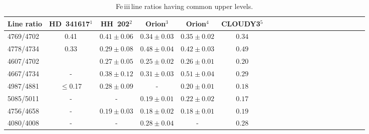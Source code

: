 \documentclass{emulateapj}
\newcommand\fe{Fe\,{\sc iii}\,}
\begin{document}
\begin{table*}
\centering

{\footnotesize
\begin{minipage}{9cm}
\centering
\caption{ \fe line ratios having common upper levels.} \label{Table:obs2}
  \begin{tabular}{lccccccccccccccccccc} \hline\hline 
	
 Line ratio  & HD~341617$^1$	&HH~202$^2$ &Orion$^3$ & Orion$^4$	&CLOUDY3$^{5}$		\\ \hline          




 4769/4702		&0.41	&$0.41 \pm 0.06$		&$0.34 \pm 0.03$			&$0.35 \pm 0.02$	&$0.34 $						\\  
 4778/4734		&0.33	&$0.29 \pm 0.08$		&$0.48 \pm 0.04$			&$0.42 \pm 0.03$	&$0.49 $						\\	
 4607/4702		&	&$0.27 \pm 0.05$		&$0.25 \pm 0.02$			&$0.26 \pm 0.01$	&$0.20$						\\	
                                                                                                                                                                          
 4667/4734		&-	&$0.38 \pm 0.12$		&$0.31 \pm 0.03$			&$0.51 \pm 0.04$	&$0.29$						\\
                                                                                                                                                                          
 4987/4881		& $\leq$0.17 & $0.28 \pm 0.09$  		& - 				&$0.20 \pm 0.01$	&$0.18$								\\  
                                                                                                                                                                          
 5085/5011		&-	&-				&$0.19 \pm 0.01$			&$0.22 \pm 0.02$	&$0.17$			        		\\	
 4756/4658		&-	&$0.19 \pm 0.03$		&$0.18 \pm 0.02$			&$0.18 \pm 0.01$	&$0.19$						\\ 
                                                                                                                                                                          
                                                                                                                                                                          
 4080/4008		&-	&-				&$0.28 \pm 0.04$			&-			&$0.28$						\\ 
                                                                                                                                                                                                                                                                                                                          

\end{tabular}
\end{minipage}}
\end{table*}
\end{document}

